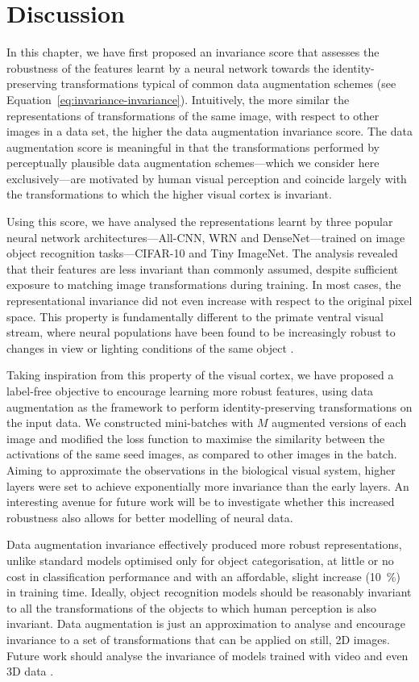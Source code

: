 {\section{Discussion}
\label{sec:invariance-discussion}
In this chapter, we have first proposed an invariance score that assesses the robustness of the features learnt by a neural network towards the identity-preserving transformations typical of common data augmentation schemes (see Equation~\ref{eq:invariance-invariance}). Intuitively, the more similar the representations of transformations of the same image, with respect to other images in a data set, the higher the data augmentation invariance score. The data augmentation score is meaningful in that the transformations performed by perceptually plausible data augmentation schemes---which we consider here exclusively---are motivated by human visual perception and coincide largely with the transformations to which the higher visual cortex is invariant.

Using this score, we have analysed the representations learnt by three popular neural network architectures---All-CNN, WRN and DenseNet---trained on image object recognition tasks---CIFAR-10 and Tiny ImageNet. The analysis revealed that their features are less invariant than commonly assumed, despite sufficient exposure to matching image transformations during training. In most cases, the representational invariance did not even increase with respect to the original pixel space. This property is fundamentally different to the primate ventral visual stream, where neural populations have been found to be increasingly robust to changes in view or lighting conditions of the same object \citep{dicarlo2007untangling}.

Taking inspiration from this property of the visual cortex, we have proposed a label-free objective to encourage learning more robust features, using data augmentation as the framework to perform identity-preserving transformations on the input data. We constructed mini-batches with $M$ augmented versions of each image and modified the loss function to maximise the similarity between the activations of the same seed images, as compared to other images in the batch. Aiming to approximate the observations in the biological visual system, higher layers were set to achieve exponentially more invariance than the early layers. An interesting avenue for future work will be to investigate whether this increased robustness also allows for better modelling of neural data.

Data augmentation invariance effectively produced more robust representations, unlike standard models optimised only for object categorisation, at little or no cost in classification performance and with an affordable, slight increase (10~\%) in training time. Ideally, object recognition models should be reasonably invariant to all the transformations of the objects to which human perception is also invariant. Data augmentation is just an approximation to analyse and encourage invariance to a set of transformations that can be applied on still, 2D images. Future work should analyse the invariance of models trained with video \citep{taylor2010spatiotemporal} and even 3D data \citep{achlioptas20183d}.

}
